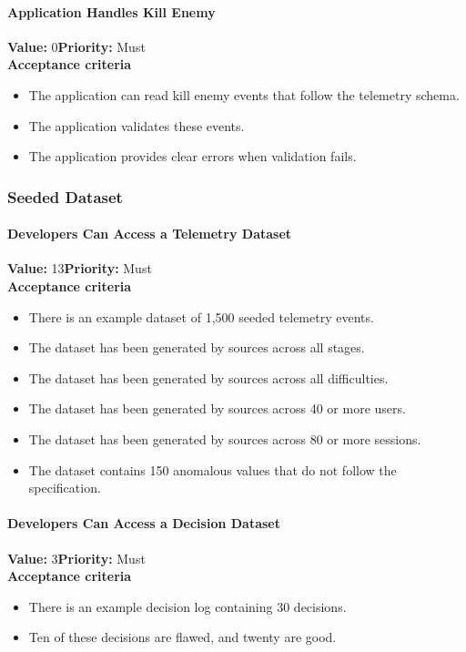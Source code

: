 \paragraph{Application Handles Kill Enemy}
\textbf{Value:} 0\quad \textbf{Priority:} Must\\
\textbf{Acceptance criteria}
\begin{itemize}
  \item The application can read kill enemy events that follow the telemetry schema.
  \item The application validates these events.
  \item The application provides clear errors when validation fails.
\end{itemize}

\subsubsection{Seeded Dataset}

\paragraph{Developers Can Access a Telemetry Dataset}
\textbf{Value:} 13\quad \textbf{Priority:} Must\\
\textbf{Acceptance criteria}
\begin{itemize}
  \item There is an example dataset of 1,500 seeded telemetry events.
  \item The dataset has been generated by sources across all stages.
  \item The dataset has been generated by sources across all difficulties.
  \item The dataset has been generated by sources across 40 or more users.
  \item The dataset has been generated by sources across 80 or more sessions.
  \item The dataset contains 150 anomalous values that do not follow the specification.
\end{itemize}

\paragraph{Developers Can Access a Decision Dataset}
\textbf{Value:} 3\quad \textbf{Priority:} Must\\
\textbf{Acceptance criteria}
\begin{itemize}
  \item There is an example decision log containing 30 decisions.
  \item Ten of these decisions are flawed, and twenty are good.
\end{itemize}

